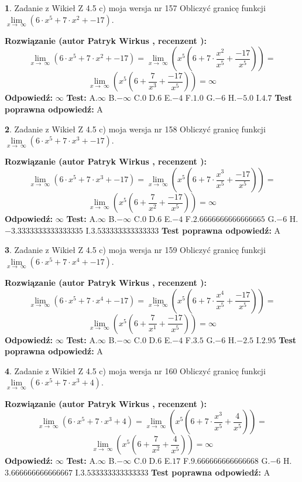 \documentclass[12pt, a4paper]{article}
\theoremstyle{definition} %
\newtheorem{zad}{}
\newcommand{\zadStart}[1]{\begin{zad}#1\newline}
\newcommand{\zadStop}{\end{zad}}
\newcommand{\rozwStart}[2]{\noindent \textbf{Rozwiązanie (autor #1 , recenzent #2): }\newline}
\newcommand{\rozwStop}{\newline}
\newcommand{\odpStart}{\noindent \textbf{Odpowiedź:}\newline}
\newcommand{\odpStop}{\newline}
\newcommand{\testStart}{\noindent \textbf{Test:}\newline}
\newcommand{\testStop}{\newline}
\newcommand{\kluczStart}{\noindent \textbf{Test poprawna odpowiedź:}\newline}
\newcommand{\kluczStop}{\newline}
\begin{document}
\zadStart{Zadanie z Wikieł Z 4.5 c) moja wersja nr 157}
Obliczyć granicę funkcji  $\lim\limits_{x\to\ \infty}(6 \cdot x^{5}+7 \cdot x^{2}+-17)$.
\zadStop
\rozwStart{Patryk Wirkus}{}
$$\lim\limits_{x\to\ \infty}(6 \cdot x^{5}+7 \cdot x^{2}+-17) = \lim\limits_{x\to\ \infty}(x^{5}(6 +7 \cdot \frac{x^{2}}{x^{5}}+\frac{-17}{x^{5}})) =$$ $$\lim\limits_{x\to\ \infty}(x^{5}(6 +\frac{7}{x^{3}}+\frac{-17}{x^{5}})) =\infty$$
\rozwStop
\odpStart
$\infty$
\odpStop
\testStart
A.$\infty$ B.$-\infty$ C.$0$ D.$6$ E.$-4$
F.$1.0$ G.$-6$
H.$-5.0$
I.$4.7$
\testStop
\kluczStart
A
\kluczStop



\zadStart{Zadanie z Wikieł Z 4.5 c) moja wersja nr 158}
Obliczyć granicę funkcji  $\lim\limits_{x\to\ \infty}(6 \cdot x^{5}+7 \cdot x^{3}+-17)$.
\zadStop
\rozwStart{Patryk Wirkus}{}
$$\lim\limits_{x\to\ \infty}(6 \cdot x^{5}+7 \cdot x^{3}+-17) = \lim\limits_{x\to\ \infty}(x^{5}(6 +7 \cdot \frac{x^{3}}{x^{5}}+\frac{-17}{x^{5}})) =$$ $$\lim\limits_{x\to\ \infty}(x^{5}(6 +\frac{7}{x^{2}}+\frac{-17}{x^{5}})) =\infty$$
\rozwStop
\odpStart
$\infty$
\odpStop
\testStart
A.$\infty$ B.$-\infty$ C.$0$ D.$6$ E.$-4$
F.$2.6666666666666665$ G.$-6$
H.$-3.3333333333333335$
I.$3.533333333333333$
\testStop
\kluczStart
A
\kluczStop



\zadStart{Zadanie z Wikieł Z 4.5 c) moja wersja nr 159}
Obliczyć granicę funkcji  $\lim\limits_{x\to\ \infty}(6 \cdot x^{5}+7 \cdot x^{4}+-17)$.
\zadStop
\rozwStart{Patryk Wirkus}{}
$$\lim\limits_{x\to\ \infty}(6 \cdot x^{5}+7 \cdot x^{4}+-17) = \lim\limits_{x\to\ \infty}(x^{5}(6 +7 \cdot \frac{x^{4}}{x^{5}}+\frac{-17}{x^{5}})) =$$ $$\lim\limits_{x\to\ \infty}(x^{5}(6 +\frac{7}{x^{1}}+\frac{-17}{x^{5}})) =\infty$$
\rozwStop
\odpStart
$\infty$
\odpStop
\testStart
A.$\infty$ B.$-\infty$ C.$0$ D.$6$ E.$-4$
F.$3.5$ G.$-6$
H.$-2.5$
I.$2.95$
\testStop
\kluczStart
A
\kluczStop



\zadStart{Zadanie z Wikieł Z 4.5 c) moja wersja nr 160}
Obliczyć granicę funkcji  $\lim\limits_{x\to\ \infty}(6 \cdot x^{5}+7 \cdot x^{3}+4)$.
\zadStop
\rozwStart{Patryk Wirkus}{}
$$\lim\limits_{x\to\ \infty}(6 \cdot x^{5}+7 \cdot x^{3}+4) = \lim\limits_{x\to\ \infty}(x^{5}(6 +7 \cdot \frac{x^{3}}{x^{5}}+\frac{4}{x^{5}})) =$$ $$\lim\limits_{x\to\ \infty}(x^{5}(6 +\frac{7}{x^{2}}+\frac{4}{x^{5}})) =\infty$$
\rozwStop
\odpStart
$\infty$
\odpStop
\testStart
A.$\infty$ B.$-\infty$ C.$0$ D.$6$ E.$17$
F.$9.666666666666668$ G.$-6$
H.$3.666666666666667$
I.$3.533333333333333$
\testStop
\kluczStart
A
\kluczStop
\end{document}
